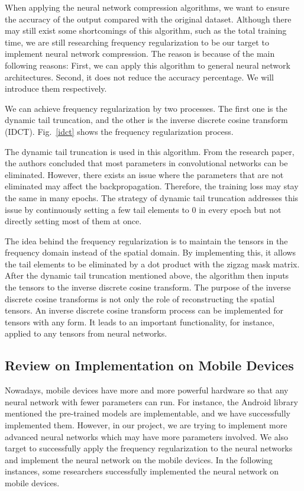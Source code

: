\documentclass{article}
\begin{document}
When applying the neural network compression algorithms, we want to ensure the accuracy of the output compared with the original dataset. Although there may still exist some shortcomings of this algorithm, such as the total training time, we are still researching frequency regularization to be our target to implement neural network compression. The reason is because of the main following reasons: First, we can apply this algorithm to general neural network architectures. Second, it does not reduce the accuracy percentage. We will introduce them respectively. 

We can achieve frequency regularization by two processes. The first one is the dynamic tail truncation, and the other is the inverse discrete cosine transform (IDCT). Fig.~\ref{idct} shows the frequency regularization process. 


The dynamic tail truncation is used in this algorithm. From the research paper, the authors concluded that most parameters in convolutional networks can be eliminated. However, there exists an issue where the parameters that are not eliminated may affect the backpropagation. Therefore, the training loss may stay the same in many epochs. The strategy of dynamic tail truncation addresses this issue by continuously setting a few tail elements to 0 in every epoch but not directly setting most of them at once.

The idea behind the frequency regularization is to maintain the tensors in the frequency domain instead of the spatial domain. By implementing this, it allows the tail elements to be eliminated by a dot product with the zigzag mask matrix. After the dynamic tail truncation mentioned above, the algorithm then inputs the tensors to the inverse discrete cosine transform. The purpose of the inverse discrete cosine transforms is not only the role of reconstructing the spatial tensors. An inverse discrete cosine transform process can be implemented for tensors with any form. It leads to an important functionality, for instance, applied to any tensors from neural networks. 

\subsection{Review on Implementation on Mobile Devices}

Nowadays, mobile devices have more and more powerful hardware so that any neural network with fewer parameters can run. For instance, the Android library mentioned the pre-trained models are implementable, and we have successfully implemented them. However, in our project, we are trying to implement more advanced neural networks which may have more parameters involved. We also target to successfully apply the frequency regularization to the neural networks and implement the neural network on the mobile devices. In the following instances, some researchers successfully implemented the neural network on mobile devices. 
\end{document}
